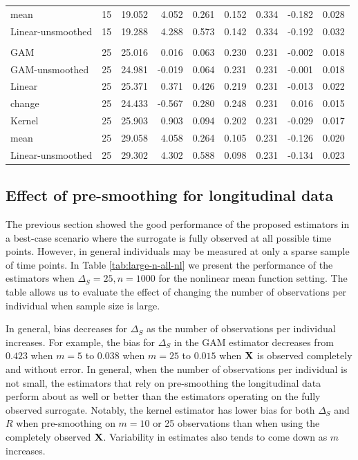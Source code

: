 \documentclass[useAMS,usenatbib,referee]{biom}
\begin{document}
\begin{table}[t]
\begin{tabular}{lrrrrrrrr}
\hspace{1em}mean & 15 & 19.052 & 4.052 & 0.261 & 0.152 & 0.334 & -0.182 & 0.028\\
\hspace{1em}Linear-unsmoothed & 15 & 19.288 & 4.288 & 0.573 & 0.142 & 0.334 & -0.192 & 0.032\\
\addlinespace[0.3em]
\multicolumn{9}{l}{\textbf{Large residual effect}}\\
\hspace{1em}GAM & 25 & 25.016 & 0.016 & 0.063 & 0.230 & 0.231 & -0.002 & 0.018\\
\hspace{1em}GAM-unsmoothed & 25 & 24.981 & -0.019 & 0.064 & 0.231 & 0.231 & -0.001 & 0.018\\
\hspace{1em}Linear & 25 & 25.371 & 0.371 & 0.426 & 0.219 & 0.231 & -0.013 & 0.022\\
\hspace{1em}change & 25 & 24.433 & -0.567 & 0.280 & 0.248 & 0.231 & 0.016 & 0.015\\
\hspace{1em}Kernel & 25 & 25.903 & 0.903 & 0.094 & 0.202 & 0.231 & -0.029 & 0.017\\
\hspace{1em}mean & 25 & 29.058 & 4.058 & 0.264 & 0.105 & 0.231 & -0.126 & 0.020\\
\hspace{1em}Linear-unsmoothed & 25 & 29.302 & 4.302 & 0.588 & 0.098 & 0.231 & -0.134 & 0.023\\
\bottomrule
\end{tabular}
\end{table}

\subsection{Effect of pre-smoothing for longitudinal data}
The previous section showed the good performance of the proposed estimators in a best-case scenario where the surrogate is fully observed at all possible time points. However, in general individuals may be measured at only a sparse sample of time points. In Table \ref{tab:large-n-all-nl} we present the performance of the estimators when $\Delta_S = 25, n = 1000$ for the nonlinear mean function setting. The table allows us to evaluate the effect of changing the number of observations per individual when sample size is large. 

In general, bias decreases for $\Delta_S$ as the number of observations per individual increases. For example, the bias for $\Delta_S$ in the GAM estimator decreases from $0.423$ when $m = 5$ to $0.038$ when $m = 25$ to $0.015$ when ${\bf X}$ is observed completely and without error. In general, when the number of observations per individual is not small, the estimators that rely on pre-smoothing the longitudinal data perform about as well or better than the estimators operating on the fully observed surrogate. Notably, the kernel estimator has lower bias for both $\Delta_S$ and $R$ when pre-smoothing on $m = 10$ or 25 observations than when using the completely observed ${\bf X}$. Variability in estimates also tends to come down as $m$ increases. 
\end{document}
